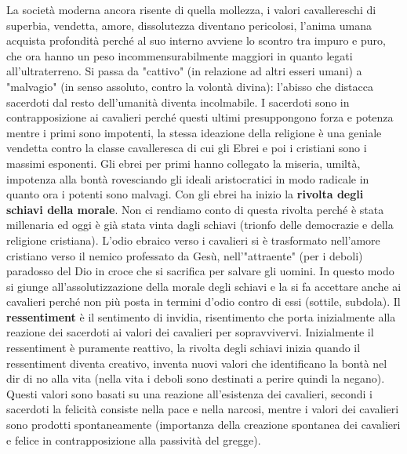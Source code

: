\documentclass[10pt,a4paper]{article}
\begin{document}
La società moderna ancora risente di quella mollezza, i valori cavallereschi di superbia, vendetta, amore, dissolutezza diventano pericolosi, l'anima umana acquista profondità perché al suo interno avviene lo scontro tra impuro e puro, che ora hanno un peso incommensurabilmente maggiori in quanto legati all'ultraterreno. Si passa da "cattivo" (in relazione ad altri esseri umani) a "malvagio" (in senso assoluto, contro la volontà divina): l'abisso che distacca sacerdoti dal resto dell'umanità diventa incolmabile. I sacerdoti sono in contrapposizione ai cavalieri perché questi ultimi presuppongono forza e potenza mentre i primi sono impotenti, la stessa ideazione della religione è una geniale vendetta contro la classe cavalleresca di cui gli Ebrei e poi i cristiani sono i massimi esponenti. Gli ebrei per primi hanno collegato la miseria, umiltà, impotenza alla bontà rovesciando gli ideali aristocratici in modo radicale in quanto ora i potenti sono malvagi. Con gli ebrei ha inizio la \textbf{rivolta degli schiavi della morale}. Non ci rendiamo conto di questa rivolta perché è stata millenaria ed oggi è già stata vinta dagli schiavi (trionfo delle democrazie e della religione cristiana). L'odio ebraico verso i cavalieri si è trasformato nell'amore cristiano verso il nemico professato da Gesù, nell'"attraente" (per i deboli) paradosso del Dio in croce che si sacrifica per salvare gli uomini. In questo modo si giunge all'assolutizzazione della morale degli schiavi e la si fa accettare anche ai cavalieri perché non più posta in termini d'odio contro di essi (sottile, subdola). Il \textbf{ressentiment} è il sentimento di invidia, risentimento che porta inizialmente alla reazione dei sacerdoti ai valori dei cavalieri per sopravvivervi. Inizialmente il ressentiment è puramente reattivo, la rivolta degli schiavi inizia quando il ressentiment diventa creativo, inventa nuovi valori che identificano la bontà nel dir di no alla vita (nella vita i deboli sono destinati a perire quindi la negano). Questi valori sono basati su una reazione all'esistenza dei cavalieri, secondi i sacerdoti la felicità consiste nella pace e nella narcosi, mentre i valori dei cavalieri sono prodotti spontaneamente (importanza della creazione spontanea dei cavalieri e felice in contrapposizione alla passività del gregge).
\end{document}
